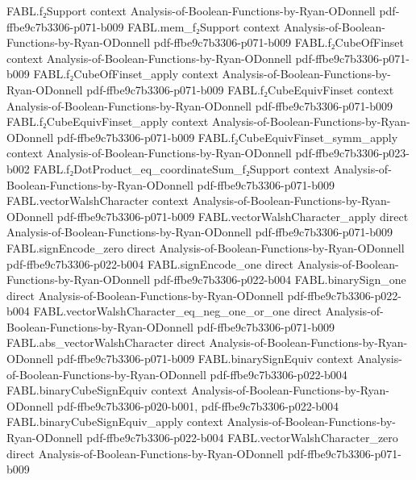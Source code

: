 \begin{theorem}
  {FABL.f₂Support}
  {context}
  {Analysis-of-Boolean-Functions-by-Ryan-ODonnell}
  {pdf-ffbe9c7b3306-p071-b009}
\proofstep
  {FABL.mem_f₂Support}
  {context}
  {Analysis-of-Boolean-Functions-by-Ryan-ODonnell}
  {pdf-ffbe9c7b3306-p071-b009}
\proofstep
  {FABL.f₂CubeOfFinset}
  {context}
  {Analysis-of-Boolean-Functions-by-Ryan-ODonnell}
  {pdf-ffbe9c7b3306-p071-b009}
\proofstep
  {FABL.f₂CubeOfFinset_apply}
  {context}
  {Analysis-of-Boolean-Functions-by-Ryan-ODonnell}
  {pdf-ffbe9c7b3306-p071-b009}
\proofstep
  {FABL.f₂CubeEquivFinset}
  {context}
  {Analysis-of-Boolean-Functions-by-Ryan-ODonnell}
  {pdf-ffbe9c7b3306-p071-b009}
\proofstep
  {FABL.f₂CubeEquivFinset_apply}
  {context}
  {Analysis-of-Boolean-Functions-by-Ryan-ODonnell}
  {pdf-ffbe9c7b3306-p071-b009}
\proofstep
  {FABL.f₂CubeEquivFinset_symm_apply}
  {context}
  {Analysis-of-Boolean-Functions-by-Ryan-ODonnell}
  {pdf-ffbe9c7b3306-p023-b002}
\proofstep
  {FABL.f₂DotProduct_eq_coordinateSum_f₂Support}
  {context}
  {Analysis-of-Boolean-Functions-by-Ryan-ODonnell}
  {pdf-ffbe9c7b3306-p071-b009}
\proofstep
  {FABL.vectorWalshCharacter}
  {context}
  {Analysis-of-Boolean-Functions-by-Ryan-ODonnell}
  {pdf-ffbe9c7b3306-p071-b009}
\proofstep
  {FABL.vectorWalshCharacter_apply}
  {direct}
  {Analysis-of-Boolean-Functions-by-Ryan-ODonnell}
  {pdf-ffbe9c7b3306-p071-b009}
\proofstep
  {FABL.signEncode_zero}
  {direct}
  {Analysis-of-Boolean-Functions-by-Ryan-ODonnell}
  {pdf-ffbe9c7b3306-p022-b004}
\proofstep
  {FABL.signEncode_one}
  {direct}
  {Analysis-of-Boolean-Functions-by-Ryan-ODonnell}
  {pdf-ffbe9c7b3306-p022-b004}
\proofstep
  {FABL.binarySign_one}
  {direct}
  {Analysis-of-Boolean-Functions-by-Ryan-ODonnell}
  {pdf-ffbe9c7b3306-p022-b004}
\proofstep
  {FABL.vectorWalshCharacter_eq_neg_one_or_one}
  {direct}
  {Analysis-of-Boolean-Functions-by-Ryan-ODonnell}
  {pdf-ffbe9c7b3306-p071-b009}
\proofstep
  {FABL.abs_vectorWalshCharacter}
  {direct}
  {Analysis-of-Boolean-Functions-by-Ryan-ODonnell}
  {pdf-ffbe9c7b3306-p071-b009}
\proofstep
  {FABL.binarySignEquiv}
  {context}
  {Analysis-of-Boolean-Functions-by-Ryan-ODonnell}
  {pdf-ffbe9c7b3306-p022-b004}
\proofstep
  {FABL.binaryCubeSignEquiv}
  {context}
  {Analysis-of-Boolean-Functions-by-Ryan-ODonnell}
  {pdf-ffbe9c7b3306-p020-b001,
    pdf-ffbe9c7b3306-p022-b004}
\proofstep
  {FABL.binaryCubeSignEquiv_apply}
  {context}
  {Analysis-of-Boolean-Functions-by-Ryan-ODonnell}
  {pdf-ffbe9c7b3306-p022-b004}
\proofstep
  {FABL.vectorWalshCharacter_zero}
  {direct}
  {Analysis-of-Boolean-Functions-by-Ryan-ODonnell}
  {pdf-ffbe9c7b3306-p071-b009}
\proofstep

\end{theorem}
